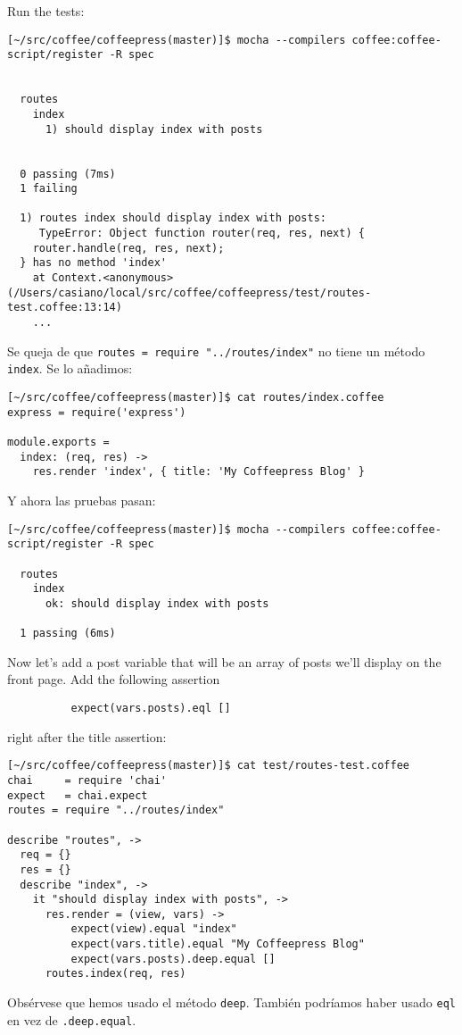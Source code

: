 Run the tests:
\begin{verbatim}
[~/src/coffee/coffeepress(master)]$ mocha --compilers coffee:coffee-script/register -R spec


  routes
    index
      1) should display index with posts


  0 passing (7ms)
  1 failing

  1) routes index should display index with posts:
     TypeError: Object function router(req, res, next) {
    router.handle(req, res, next);
  } has no method 'index'
    at Context.<anonymous> (/Users/casiano/local/src/coffee/coffeepress/test/routes-test.coffee:13:14)
    ...
\end{verbatim}

Se queja de que \verb|routes = require "../routes/index"| no tiene un método \verb|index|.
Se lo añadimos:
\begin{verbatim}
[~/src/coffee/coffeepress(master)]$ cat routes/index.coffee 
express = require('express')

module.exports = 
  index: (req, res) ->
    res.render 'index', { title: 'My Coffeepress Blog' }
\end{verbatim}

Y ahora las pruebas pasan:

\begin{verbatim}
[~/src/coffee/coffeepress(master)]$ mocha --compilers coffee:coffee-script/register -R spec

  routes
    index
      ok: should display index with posts 

  1 passing (6ms)
\end{verbatim}

Now let’s add a post variable that will be an array of posts we’ll display on the front page. Add the following assertion 
\begin{verbatim}
          expect(vars.posts).eql []
\end{verbatim}

right after the title assertion:

\begin{verbatim}
[~/src/coffee/coffeepress(master)]$ cat test/routes-test.coffee 
chai     = require 'chai'
expect   = chai.expect
routes = require "../routes/index"

describe "routes", ->
  req = {}
  res = {}
  describe "index", ->
    it "should display index with posts", ->
      res.render = (view, vars) ->
          expect(view).equal "index"
          expect(vars.title).equal "My Coffeepress Blog"
          expect(vars.posts).deep.equal []
      routes.index(req, res)
\end{verbatim}
Obsérvese  que hemos usado el método \verb|deep|. También podríamos haber usado \verb|eql| en vez
de \verb|.deep.equal|.


